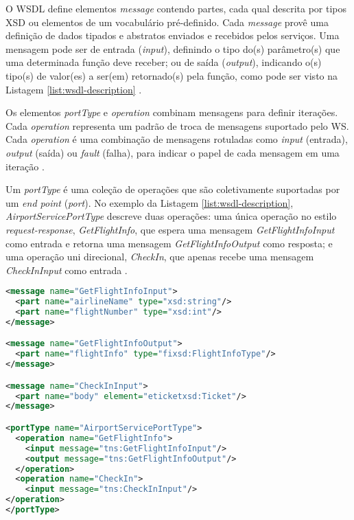 O WSDL define elementos \textit{message} contendo partes, cada qual descrita
por tipos XSD ou elementos de um vocabulário pré-definido.
Cada \textit{message} provê uma definição de dados tipados e abstratos
enviados e recebidos pelos serviços. Uma mensagem pode ser de entrada (\textit{input}),
definindo o tipo do(s) parâmetro(s) que uma determinada função deve receber; 
ou de saída (\textit{output}), indicando o(s) tipo(s) de valor(es) a ser(em) retornado(s)
pela função, como pode ser visto na Listagem \ref{list:wsdl-description} \cite{curbera2002unraveling}.

Os elementos \textit{portType} e \textit{operation} combinam mensagens para definir
iterações. Cada \textit{operation} representa um padrão de troca de mensagens
suportado pelo WS. Cada \textit{operation} é uma combinação de mensagens
rotuladas como \textit{input} (entrada), \textit{output} (saída) ou \textit{fault} (falha),
para indicar o papel de cada mensagem em uma iteração \cite{curbera2002unraveling}.

Um \textit{portType} é uma coleção de operações que são coletivamente suportadas
por um \textit{end point} (\textit{port}). No exemplo da Listagem \ref{list:wsdl-description},
\textit{AirportServicePortType} descreve duas operações: uma única operação
no estilo \textit{request-response}, \textit{GetFlightInfo}, que espera
uma mensagem \textit{GetFlightInfoInput} como entrada e retorna
uma mensagem \textit{GetFlightInfoOutput} como resposta; e uma operação
uni direcional, \textit{CheckIn}, que apenas recebe uma mensagem \textit{CheckInInput}
como entrada \cite{curbera2002unraveling}.

\begin{lstlisting}[language=xml]
<message name="GetFlightInfoInput">
  <part name="airlineName" type="xsd:string"/>
  <part name="flightNumber" type="xsd:int"/>
</message>

<message name="GetFlightInfoOutput">
  <part name="flightInfo" type="fixsd:FlightInfoType"/>
</message>

<message name="CheckInInput">
  <part name="body" element="eticketxsd:Ticket"/>
</message>

<portType name="AirportServicePortType">
  <operation name="GetFlightInfo">
    <input message="tns:GetFlightInfoInput"/>                   
    <output message="tns:GetFlightInfoOutput"/>
  </operation>
  <operation name="CheckIn">
    <input message="tns:CheckInInput"/>
</operation>
</portType>
\end{lstlisting}


